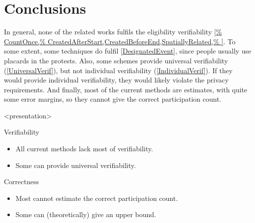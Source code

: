\mode*
\section{Conclusions}


In general, none of the related works fulfils the eligibility verifiability 
\cref{%
  CountOnce,%
  CreatedAfterStart,CreatedBeforeEnd,SpatiallyRelated,%
}.
To some extent, some techniques do fulfil \cref{DesignatedEvent}, since people 
usually use placards in the protests.
Also, some schemes provide universal verifiability (\cref{UniversalVerif}), but 
not individual verifiability (\cref{IndividualVerif}).
If they would provide individual verifiability, they would likely violate the 
privacy requirements.
And finally, most of the current methods are estimates, with quite some error 
margins, so they cannot give the correct participation count.

\begin{frame}<presentation>
  \begin{block}{Verifiability}
    \begin{itemize}
      \item All current methods lack most of verifiability.
      \item Some can provide universal verifiability.
    \end{itemize}
  \end{block}

  \pause{}

  \begin{block}{Correctness}
    \begin{itemize}
      \item Most cannot estimate the correct participation count.
      \item Some can (theoretically) give an upper bound.
    \end{itemize}
  \end{block}
\end{frame}
